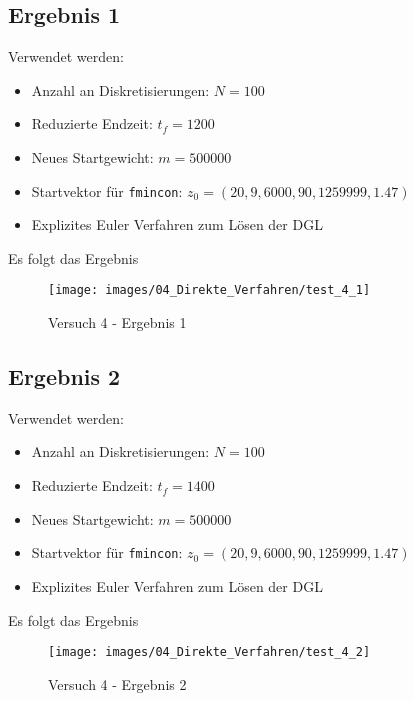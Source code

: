 \subsection{Ergebnis 1}
Verwendet werden:
\begin{itemize}
\item Anzahl an Diskretisierungen: $N = 100$ 
\item Reduzierte Endzeit: $t_f = 1200$
\item Neues Startgewicht: $m = 500000$
\item Startvektor für \texttt{fmincon}: $z_0 = (20,9,6000,90,1259999,1.47)$
\item Explizites Euler Verfahren zum Lösen der DGL
\end{itemize}
Es folgt das Ergebnis
\begin{figure}[H]
\begin{center}
\texttt{[image: images/04\_Direkte\_Verfahren/test\_4\_1]}
\caption{Versuch 4 - Ergebnis 1}\label{img:test_4_1}
\end{center}
\end{figure}

\newpage
\subsection{Ergebnis 2}
Verwendet werden:
\begin{itemize}
\item Anzahl an Diskretisierungen: $N = 100$ 
\item Reduzierte Endzeit: $t_f = 1400$
\item Neues Startgewicht: $m = 500000$
\item Startvektor für \texttt{fmincon}: $z_0 = (20,9,6000,90,1259999,1.47)$
\item Explizites Euler Verfahren zum Lösen der DGL
\end{itemize}
Es folgt das Ergebnis
\begin{figure}[H]
\begin{center}
\texttt{[image: images/04\_Direkte\_Verfahren/test\_4\_2]}
\caption{Versuch 4 - Ergebnis 2}\label{img:test_4_2}
\end{center}
\end{figure}

\newpage
